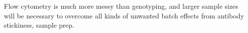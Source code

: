 Flow cytometry is much more messy than genotyping, and larger sample sizes will be necessary to overcome all kinds of unwanted batch effects from antibody stickiness, sample prep.



%
%









